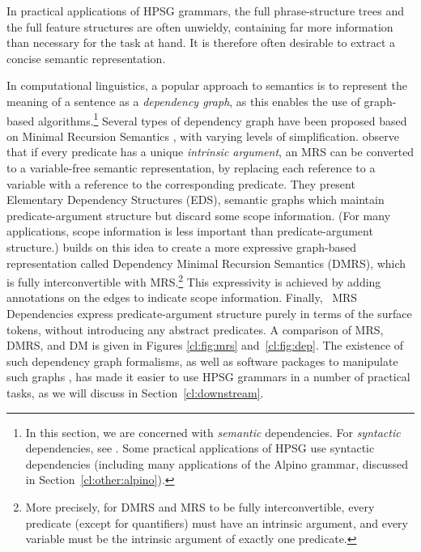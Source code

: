 \documentclass[output=paper,nonflat]{langsci/langscibook}
\begin{document}
In practical applications of HPSG grammars,
the full phrase-structure trees and the full feature structures are often unwieldy,
containing far more information than necessary for the task at hand.
It is therefore often desirable to extract a concise semantic representation.

In computational linguistics,
a popular approach to semantics is to represent the meaning of a sentence as a \textit{dependency graph},
as this enables the use of graph-based algorithms.\footnote{%
	In this section, we are concerned with \emph{semantic} dependencies.
	For \emph{syntactic} dependencies, see .
	Some practical applications of HPSG use syntactic dependencies
	(including many applications of the Alpino grammar, discussed in Section~\ref{cl:other:alpino}).
}
Several types of dependency graph have been proposed
based on Minimal Recursion Semantics \citep[MRS;][]{CFPS2005a},
with varying levels of simplification.
\citet{oepen2006eds} observe that if every predicate has a unique
\textit{intrinsic argument}, an MRS can be converted to a variable-free semantic representation,
by replacing each reference to a variable with a reference to the corresponding predicate.
They present Elementary Dependency Structures (EDS),
semantic graphs which maintain predicate-argument structure but discard some scope information.
(For many applications, scope information is less important than predicate-argument structure.)
\citet{copestake2009dmrs} builds on this idea
to create a more expressive graph-based representation called
Dependency Minimal Recursion Semantics (DMRS),
which is fully interconvertible with MRS.\footnote{%
	More precisely, for DMRS and MRS to be fully interconvertible,
	every predicate (except for quantifiers) must have an intrinsic argument,
	and every variable must be the intrinsic argument of exactly one predicate.
} This expressivity is achieved by adding annotations on the edges to
indicate scope information.
Finally, \delphin\ MRS Dependencies \citep[DM;][]{ivanova2012dm}
express predicate-argument structure purely in terms of the surface tokens,
without introducing any abstract predicates.
A comparison of MRS, DMRS, and DM is given in Figures \ref{cl:fig:mrs} and~\ref{cl:fig:dep}.
The existence of such dependency graph formalisms,
as well as software packages to manipulate such graphs \citep{copestake2016pydmrs},
has made it easier to use HPSG grammars in a number of practical tasks,
as we will discuss in Section~\ref{cl:downstream}.
\end{document}
